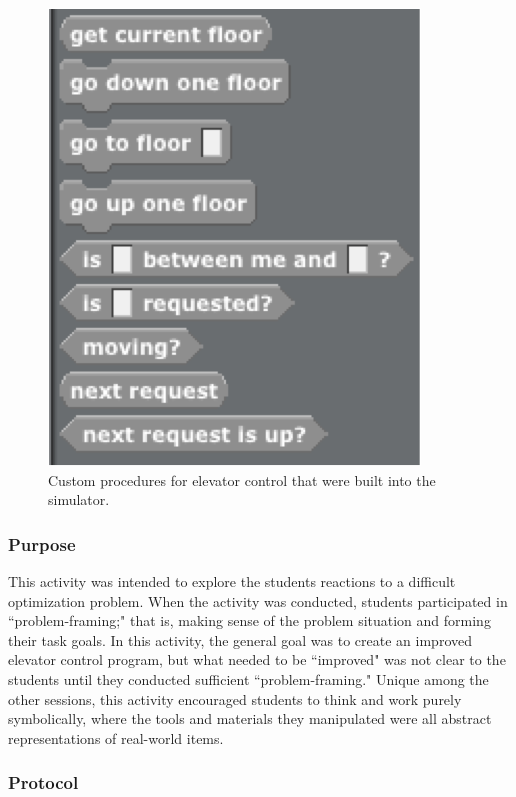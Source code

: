 	
	\begin{figure}
	\begin{centering}
	\includegraphics{images/elevator_primitives}
	\par\end{centering}
	\caption[Custom procedures for elevator control.]{Custom procedures for elevator control that were built into the simulator.}
	\label{fig:elevator-blocks}
	\end{figure}
	
	\subsubsection{Purpose}
	
	This activity was intended to explore the students reactions to a difficult optimization problem. When the activity was conducted, students participated in ``problem-framing;" that is, making sense of the problem situation and forming their task goals. In this activity, the general goal was to create an improved elevator control program, but what needed to be ``improved" was not clear to the students until they conducted sufficient ``problem-framing." Unique among the other sessions, this activity encouraged students to think and work purely symbolically, where the tools and materials they manipulated were all abstract representations of real-world items.
	
	
	\subsubsection{Protocol}
	
